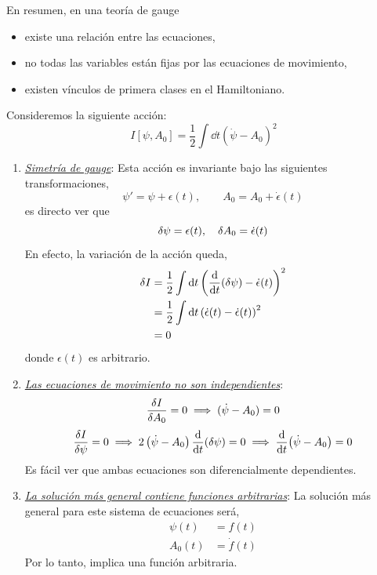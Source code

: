 \begin{tcolorbox}
En resumen, en una teoría de gauge
\begin{itemize}
	\item existe una relación entre las ecuaciones,
	\item no todas las variables están fijas por las ecuaciones de movimiento,
	\item existen vínculos de primera clases en el Hamiltoniano.
\end{itemize}
\end{tcolorbox}

\begin{ej}
	Consideremos la siguiente acción:
	\begin{equation}
  I[\psi,A_0]=\frac{1}{2}\int\dd t\left(\dot{\psi}-A_0\right)^2
\end{equation}
\begin{enumerate}
	\item \underline{\textit{Simetría de gauge}}: Esta acción es invariante bajo las siguientes transformaciones,
	\begin{equation}
  \psi'=\psi+\epsilon(t),\qquad A_0=A_0+\dot{\epsilon}(t)
\end{equation}
es directo ver que
\begin{equation}
  \delta\psi=\epsilon(t),\quad \delta A_0=\dot{\epsilon}(t)
\end{equation}
En efecto, la variación de la acción queda,
\begin{align}
  \delta I&=\frac{1}{2}\int\dd t\left(\dv{t}(\delta\psi)-\dot{\epsilon}(t)\right)^2\\
  &=\frac{1}{2}\int\dd t\left(\dot{\epsilon}(t)-\dot{\epsilon}(t)\right)^2\\
  &=0
\end{align}
donde $\epsilon(t)$ es arbitrario.

\item \underline{\textit{Las ecuaciones de movimiento no son independientes}}:
\begin{equation}
  \frac{\delta I}{\delta A_0}=0\implies (\dot{\psi}-A_0)=0
\end{equation}
\begin{equation}
  \frac{\delta I}{\delta \psi}=0\implies 2\left(\dot{\psi}-A_0\right)\dv{t}(\delta\psi)=0\implies \dv{t}(\dot{\psi}-A_0)=0
\end{equation}
Es fácil ver que ambas ecuaciones son diferencialmente dependientes.
\item \underline{\textit{La solución más general contiene funciones arbitrarias}}: La solución más general para este sistema de ecuaciones será,
\begin{align}
  \psi(t)&=f(t)\\
  A_0(t)&=\dot{f}(t)
\end{align}
Por lo tanto, implica una función arbitraria.


\end{enumerate}
\end{ej}
